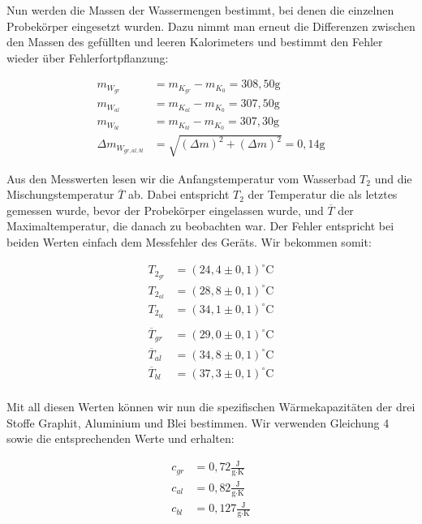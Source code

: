 \documentclass{article}
\begin{document}
Nun werden die Massen der Wassermengen bestimmt, bei denen die einzelnen Probekörper eingesetzt wurden. Dazu nimmt man erneut die Differenzen zwischen den Massen des gefüllten und leeren Kalorimeters und bestimmt den Fehler wieder über Fehlerfortpflanzung:

\begin{equation}
    \begin{split}
        m_{W_{gr}} &= m_{K_{gr}} - m_{K_0} = 308,50 \text{g} \\
        m_{W_{al}} &= m_{K_{al}} - m_{K_0} = 307,50 \text{g} \\
        m_{W_{bl}} &= m_{K_{bl}} - m_{K_0} = 307,30 \text{g} \\
        \Delta m_{W_{gr, al, bl}} &= \sqrt{(\Delta m)^2 + (\Delta m)^2} = 0,14 \text{g}
    \end{split}
\end{equation}

Aus den Messwerten lesen wir die Anfangstemperatur vom Wasserbad $T_2$ und die Mischungstemperatur $\overline{T}$ ab. Dabei entspricht $T_2$ der Temperatur die als letztes gemessen wurde, bevor der Probekörper eingelassen wurde, und $\overline{T}$ der Maximaltemperatur, die danach zu beobachten war. Der Fehler entspricht bei beiden Werten einfach dem Messfehler des Geräts. Wir bekommen somit:

\begin{equation}
    \begin{split}
        T_{2_{gr}} &= (24,4 \pm 0,1)^{\circ} \text{C} \\
        T_{2_{al}} &= (28,8 \pm 0,1)^{\circ} \text{C} \\
        T_{2_{bl}} &= (34,1 \pm 0,1)^{\circ} \text{C} \\ \\
        \overline{T}_{gr} &= (29,0 \pm 0,1)^{\circ} \text{C} \\
        \overline{T}_{al} &= (34,8 \pm 0,1)^{\circ} \text{C} \\
        \overline{T}_{bl} &= (37,3 \pm 0,1)^{\circ} \text{C} \\
    \end{split}
\end{equation}

Mit all diesen Werten können wir nun die spezifischen Wärmekapazitäten der drei Stoffe Graphit, Aluminium und Blei bestimmen. Wir verwenden Gleichung 4 sowie die entsprechenden Werte und erhalten:

\begin{equation}
    \begin{split}
        c_{gr} &= 0,72 \frac{\text{J}}{\text{g} \cdot \text{K}} \\
        c_{al} &= 0,82 \frac{\text{J}}{\text{g} \cdot \text{K}} \\
        c_{bl} &= 0,127 \frac{\text{J}}{\text{g} \cdot \text{K}} \\
    \end{split}
\end{equation}
\end{document}
